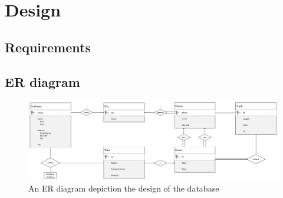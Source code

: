 \section{Design}



\subsection{Requirements} %

\subsection{ER diagram}

\begin{figure}[h]
    \centering
   \includegraphics[angle=90,origin=c,width=.4\textwidth]{img/Handwritten_ER} %
    \caption{An ER diagram depiction the design of the database}
    \label{fig:ER}
\end{figure}

